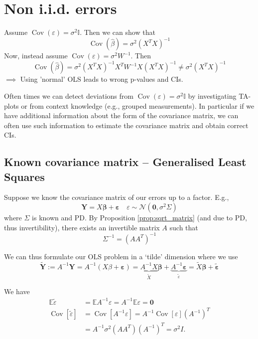 \documentclass[11pt, %
	oneside, %
	english, %
	onehalfspacing, %
	]{article} %
\numberwithin{equation}{section}
\begin{document}
\section{Non i.i.d. errors}

Assume $\operatorname{Cov} \left( \varepsilon \right) = \sigma^2 \mathbb{I}$. Then we can show that
$$
\operatorname{Cov} \left( \hat{\beta}\right) =  \sigma^2 (X^T X)^{-1}
$$
Now, instead assume $\operatorname{Cov} \left( \varepsilon\right) = \sigma^2 W^{-1}$. Then
$$
\operatorname{Cov} \left( \hat{\beta}\right) =\sigma^2 (X^T X)^{-1} X^T W^{-1} X (X^T X)^{-1} \neq \sigma^2 (X^T X)^{-1}
$$
$\implies$ Using 'normal' OLS leads to wrong p-values and CIs.

Often times we can detect deviations from $\operatorname{Cov} \left( \varepsilon \right) = \sigma^2 \mathbb{I}$ by investigating TA-plots or from context knowledge (e.g., grouped measurements). In particular if we have additional information about the form of the covariance matrix, we can often use such information to estimate the covariance matrix and obtain correct CIs.


\subsection{Known covariance matrix -- Generalised Least Squares}

Suppose we know the covariance matrix of our errors up to a factor. E.g.,
\begin{equation*}
    \mathbf{Y}=X \mathbf{\beta}+\mathbf{\varepsilon} \quad \varepsilon \sim \mathcal{N}\left(\mathbf{0}, \sigma^2 \Sigma\right)
\end{equation*}
where $\Sigma$ is known and PD. By Proposition \ref{prop:sqrt_matrix} (and due to PD, thus invertibility), there exists an invertible matrix $A$ such that
\begin{equation*}
    \Sigma^{-1} = (A A^T)^{-1}
\end{equation*}

We can thus formulate our OLS problem in a `tilde' dimension where we use
\begin{equation*}
    \tilde{\mathbf{Y}}:=A^{-1} \mathbf{Y}=A^{-1}(X \beta+\mathbf{\varepsilon})=\underbrace{A^{-1} X}_{\tilde{X}} \mathbf{\beta}+\underbrace{A^{-1} \mathbf{\varepsilon}}_{\tilde{\varepsilon}}=\tilde{X} \mathbf{\beta}+\tilde{\mathbf{\varepsilon}}
\end{equation*}

We have
\begin{align*}
        \mathbb{E} \tilde{\varepsilon} & =\mathbb{E} A^{-1} \varepsilon=A^{-1} \mathbb{E} \varepsilon=\mathbf{0} \\
        \operatorname{Cov}[\tilde{\varepsilon}] & =\operatorname{Cov}\left[A^{-1} \varepsilon\right]=A^{-1} \operatorname{Cov}[\varepsilon]\left(A^{-1}\right)^T \\
        & =A^{-1} \sigma^2\left(A A^T\right)\left(A^{-1}\right)^T=\sigma^2 I .
\end{align*}
\end{document}
